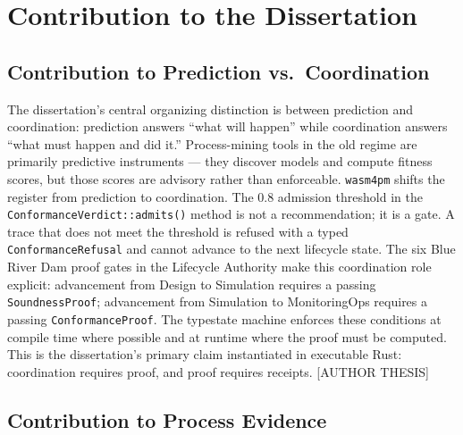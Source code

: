 \section{Contribution to the Dissertation}
\label{sec:sources-wasm4pm-contribution}

\subsection{Contribution to Prediction vs.~Coordination}
\label{sec:sources-wasm4pm-contrib-prediction-coordination}

The dissertation's central organizing distinction is between prediction and coordination:
prediction answers ``what will happen'' while coordination answers ``what must happen and did it.''
Process-mining tools in the old regime are primarily predictive instruments — they discover
models and compute fitness scores, but those scores are advisory rather than enforceable.
\texttt{wasm4pm} shifts the register from prediction to coordination. The 0.8 admission threshold
in the \texttt{ConformanceVerdict::admits()} method is not a recommendation; it is a gate. A
trace that does not meet the threshold is refused with a typed \texttt{ConformanceRefusal} and
cannot advance to the next lifecycle state. The six Blue River Dam proof gates in the Lifecycle
Authority make this coordination role explicit: advancement from Design to Simulation requires a
passing \texttt{SoundnessProof}; advancement from Simulation to MonitoringOps requires a passing
\texttt{ConformanceProof}. The typestate machine enforces these conditions at compile time where
possible and at runtime where the proof must be computed. This is the dissertation's primary
claim instantiated in executable Rust: coordination requires proof, and proof requires receipts.
[AUTHOR THESIS]

\subsection{Contribution to Process Evidence}
\label{sec:sources-wasm4pm-contrib-process-evidence}

